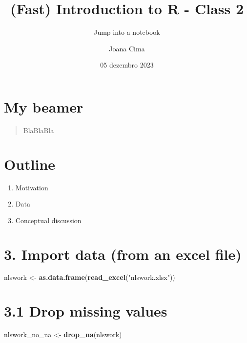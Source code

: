 \documentclass[
]{article}
\title{(Fast) Introduction to R - Class 2}
\subtitle{Jump into a notebook}
\author{Joana Cima}
\date{05 dezembro 2023}
\newenvironment{Shaded}{\begin{snugshade}}{\end{snugshade}}
\newcommand{\FunctionTok}[1]{\textcolor[rgb]{0.13,0.29,0.53}{\textbf{#1}}}
\newcommand{\NormalTok}[1]{#1}
\newcommand{\OtherTok}[1]{\textcolor[rgb]{0.56,0.35,0.01}{#1}}
\newcommand{\StringTok}[1]{\textcolor[rgb]{0.31,0.60,0.02}{#1}}
\providecommand{\tightlist}{%
  \setlength{\itemsep}{0pt}\setlength{\parskip}{0pt}}
\begin{document}
\maketitle

\hypertarget{my-beamer}{%
\section{My beamer}\label{my-beamer}}

\begin{quote}
BlaBlaBla
\end{quote}

\hypertarget{outline}{%
\section{Outline}\label{outline}}

\begin{enumerate}
\def\labelenumi{\arabic{enumi}.}
\tightlist
\item
  Motivation
\item
  Data
\item
  Conceptual discussion
\end{enumerate}

\hypertarget{import-data-from-an-excel-file}{%
\section{3. Import data (from an excel
file)}\label{import-data-from-an-excel-file}}

\begin{Shaded}
\begin{Highlighting}[]
\NormalTok{nlswork }\OtherTok{\textless{}{-}} \FunctionTok{as.data.frame}\NormalTok{(}\FunctionTok{read\_excel}\NormalTok{(}\StringTok{"nlswork.xlsx"}\NormalTok{))}
\end{Highlighting}
\end{Shaded}

\hypertarget{drop-missing-values}{%
\section{3.1 Drop missing values}\label{drop-missing-values}}

\begin{Shaded}
\begin{Highlighting}[]
\NormalTok{nlswork\_no\_na }\OtherTok{\textless{}{-}} \FunctionTok{drop\_na}\NormalTok{(nlswork)}
\end{Highlighting}
\end{Shaded}
\end{document}
